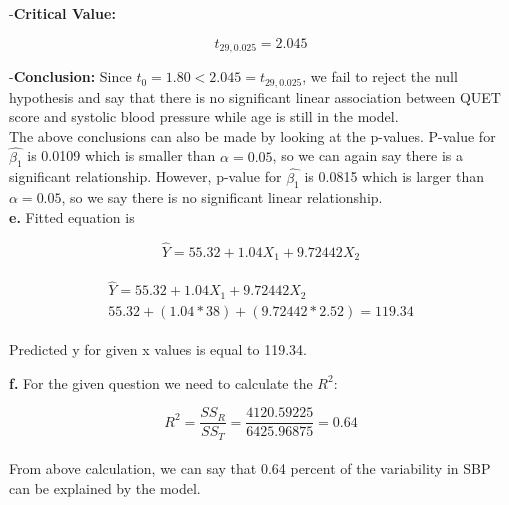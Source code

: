 \documentclass{article}
\begin{document}
-\textbf{Critical Value:}

\begin{equation}
    t_{29,0.025} = 2.045
\end{equation}

-\textbf{Conclusion:}
Since $t_0 = 1.80 < 2.045 =  t_{29,0.025}$, we fail to reject the null hypothesis and say that there is no significant linear association between QUET score and systolic blood pressure while age is still in the model.
\\

The above conclusions can also be made by looking at the p-values. P-value for $\hat{\beta_1}$ is 0.0109 which is smaller than $\alpha=0.05$, so we can again say there is a significant relationship. However, p-value for $\hat{\beta_1}$ is 0.0815 which is larger than $\alpha=0.05$, so we say there is no significant linear relationship.
\\
\newpage
\textbf{e.} Fitted equation is

\begin{equation}
     \hat{Y} = 55.32 + 1.04X_1 + 9.72442X_2
\end{equation}

\begin{align}
    \begin{split}
        \hat{Y} = 55.32 + 1.04X_1 + 9.72442X_2
        \\
        55.32 + (1.04*38) + (9.72442*2.52) = 119.34
    \end{split}
\end{align}

Predicted y for given x values is equal to 119.34.


\textbf{f.} For the given question we need to calculate the $R^2$:

\begin{equation}
    R^2 = \frac{SS_R}{SS_T} = \frac{4120.59225}{6425.96875} = 0.64
\end{equation}
\\

From above calculation, we can say that 0.64 percent of the variability in SBP can be explained by the model.
\end{document}
